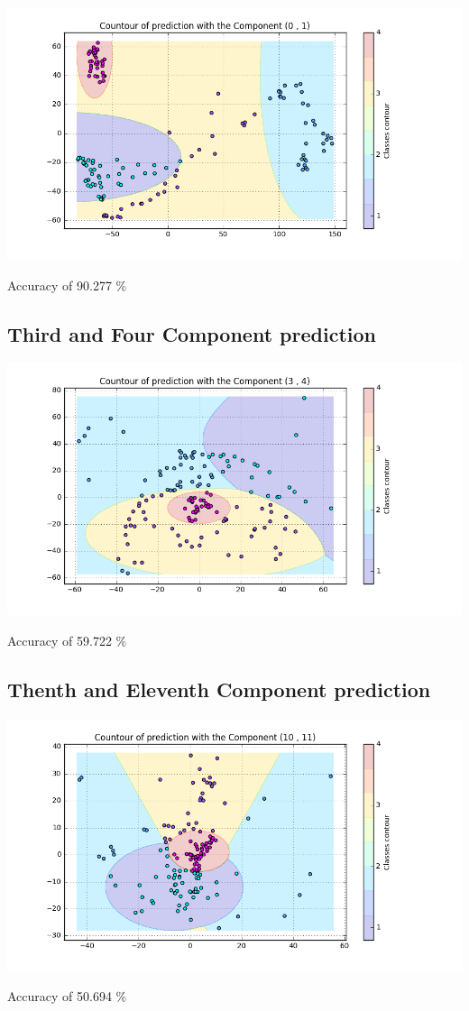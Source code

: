 \documentclass[11pt]{article}
\begin{document}
\begin{center}
 \includegraphics[scale=0.5]{4}
 
 Accuracy of  90.277 \%
\end{center}

\subsection{Third and Four Component prediction}

\begin{center}
 \includegraphics[scale=0.5]{5}
 
 Accuracy of  59.722 \%
\end{center}

\subsection{Thenth and Eleventh Component prediction}

\begin{center}
 \includegraphics[scale=0.5]{6}
 
 Accuracy of  50.694 \%
\end{center}
\end{document}

